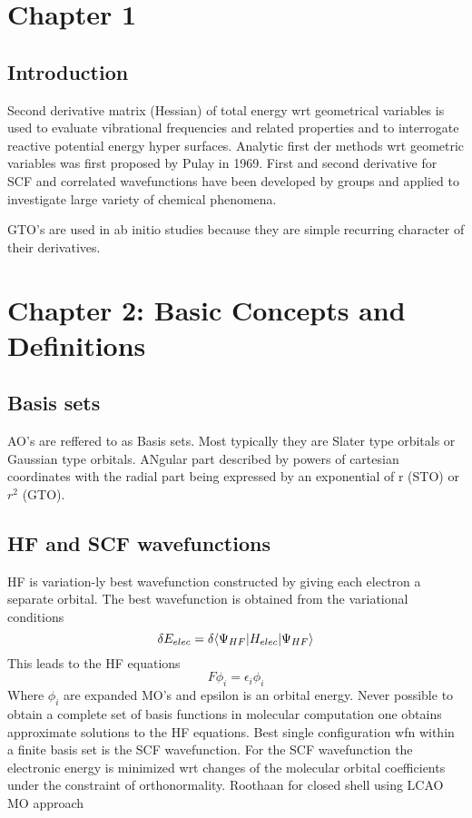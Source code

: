 \section{Chapter 1}
	\subsection{Introduction}
		Second derivative matrix (Hessian) of total energy wrt geometrical variables is used to evaluate vibrational frequencies and related properties and to interrogate reactive potential energy hyper surfaces.  Analytic first der methods wrt geometric variables was first proposed by Pulay in 1969.  First and second derivative for SCF and correlated wavefunctions have been developed by groups and applied to investigate large variety of chemical phenomena.

		GTO's are used in ab initio studies because they are simple recurring character of their derivatives.  
\section{Chapter 2: Basic Concepts and Definitions}
	\subsection{Basis sets}
		AO's are reffered to as Basis sets. Most typically they are Slater type orbitals or Gaussian type orbitals.  ANgular part described by powers of cartesian coordinates with the radial part being expressed by an exponential of r (STO) or $r^2$ (GTO).
	\subsection{HF and SCF wavefunctions}
		HF is variation-ly best wavefunction constructed by giving each electron a separate orbital.  The best wavefunction is obtained from the variational conditions 
			\begin{equation}
				\delta E_{elec} = \delta \langle\Psi_{HF} | H_{elec} | \Psi_{HF} \rangle
			\end{equation}
		This leads to the HF equations
			\begin{equation}
				F\phi_i = \epsilon_i \phi_i
			\end{equation}
		Where $\phi_i$ are expanded MO's and epsilon is an orbital energy. Never possible to obtain a complete set of basis functions in molecular computation one obtains approximate solutions to the HF equations.  Best single configuration wfn within a finite basis set is the SCF wavefunction.  For the SCF wavefunction the electronic energy is minimized wrt changes of the molecular orbital coefficients under the constraint of orthonormality. Roothaan for closed shell using LCAO MO approach

